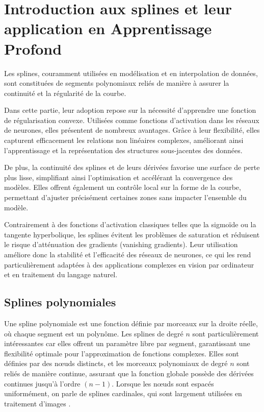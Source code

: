 \documentclass[a4paper, 12pt]{report} %
\begin{document}
\section{Introduction aux splines et leur application en Apprentissage Profond}

Les splines, couramment utilisées en modélisation et en interpolation de données, sont constituées de segments polynomiaux reliés de manière à assurer la continuité et la régularité de la courbe.

Dans cette partie, leur adoption repose sur la nécessité d'apprendre une fonction de régularisation convexe. Utilisées comme fonctions d'activation dans les réseaux de neurones, elles présentent de nombreux avantages. Grâce à leur flexibilité, elles capturent efficacement les relations non linéaires complexes, améliorant ainsi l'apprentissage et la représentation des structures sous-jacentes des données.

De plus, la continuité des splines et de leurs dérivées favorise une surface de perte plus lisse, simplifiant ainsi l’optimisation et accélérant la convergence des modèles. Elles offrent également un contrôle local sur la forme de la courbe, permettant d'ajuster précisément certaines zones sans impacter l’ensemble du modèle.

Contrairement à des fonctions d'activation classiques telles que la sigmoïde ou la tangente hyperbolique, les splines évitent les problèmes de saturation et réduisent le risque d’atténuation des gradients (vanishing gradients). Leur utilisation améliore donc la stabilité et l'efficacité des réseaux de neurones, ce qui les rend particulièrement adaptées à des applications complexes en vision par ordinateur et en traitement du langage naturel.

\subsection{Splines polynomiales}

Une spline polynomiale est une fonction définie par morceaux sur la droite réelle, où chaque segment est un polynôme. Les splines de degré \( n \) sont particulièrement intéressantes car elles offrent un paramètre libre par segment, garantissant une flexibilité optimale pour l’approximation de fonctions complexes. Elles sont définies par des nœuds distincts, et les morceaux polynomiaux de degré \( n \) sont reliés de manière continue, assurant que la fonction globale possède des dérivées continues jusqu'à l'ordre \( (n - 1) \). Lorsque les nœuds sont espacés uniformément, on parle de splines cardinales, qui sont largement utilisées en traitement d’images \cite{unser1999splines}.  
\end{document}
